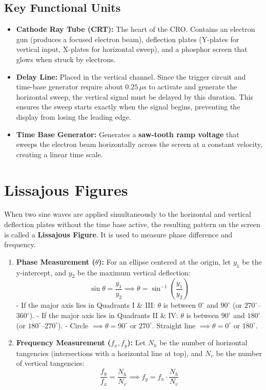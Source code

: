\documentclass[12pt,a4paper]{article}
\begin{document}
\subsection{Key Functional Units}
\begin{itemize}[leftmargin=*, itemsep=3.5pt]
  \item \textbf{Cathode Ray Tube (CRT):} The heart of the CRO. Contains an electron gun (produces a focused electron beam), deflection plates (Y-plates for vertical input, X-plates for horizontal sweep), and a phosphor screen that glows when struck by electrons.
  \item \textbf{Delay Line:} Placed in the vertical channel. Since the trigger circuit and time-base generator require about $0.25\,\mu\text{s}$ to activate and generate the horizontal sweep, the vertical signal must be delayed by this duration. This ensures the sweep starts exactly when the signal begins, preventing the display from losing the leading edge.
  \item \textbf{Time Base Generator:} Generates a \textbf{saw-tooth ramp voltage} that sweeps the electron beam horizontally across the screen at a constant velocity, creating a linear time scale.
\end{itemize}

\section{Lissajous Figures}

When two sine waves are applied simultaneously to the horizontal and vertical deflection plates without the time base active, the resulting pattern on the screen is called a \textbf{Lissajous Figure}. It is used to measure phase difference and frequency.

\begin{tcolorbox}[formulabox, title={\textbf{Lissajous Wave Measurements}}]
\begin{enumerate}[leftmargin=*, itemsep=4.5pt, label=\arabic*.]
  \item \textbf{Phase Measurement ($\theta$):}
    For an ellipse centered at the origin, let $y_1$ be the y-intercept, and $y_2$ be the maximum vertical deflection:
    $$\sin \theta = \frac{y_1}{y_2} \implies \theta = \sin^{-1}\left(\frac{y_1}{y_2}\right)$$
    - If the major axis lies in Quadrants I \& III: $\theta$ is between $0^\circ$ and $90^\circ$ (or $270^\circ$--$360^\circ$).
    - If the major axis lies in Quadrants II \& IV: $\theta$ is between $90^\circ$ and $180^\circ$ (or $180^\circ$--$270^\circ$).
    - Circle $\implies \theta = 90^\circ$ or $270^\circ$. Straight line $\implies \theta = 0^\circ$ or $180^\circ$.
  \item \textbf{Frequency Measurement ($f_x, f_y$):}
    Let $N_h$ be the number of horizontal tangencies (intersections with a horizontal line at top), and $N_v$ be the number of vertical tangencies:
    $$\frac{f_y}{f_x} = \frac{N_h}{N_v} \implies f_y = f_x \cdot \frac{N_h}{N_v}$$
\end{enumerate}
\end{tcolorbox}
\end{document}
